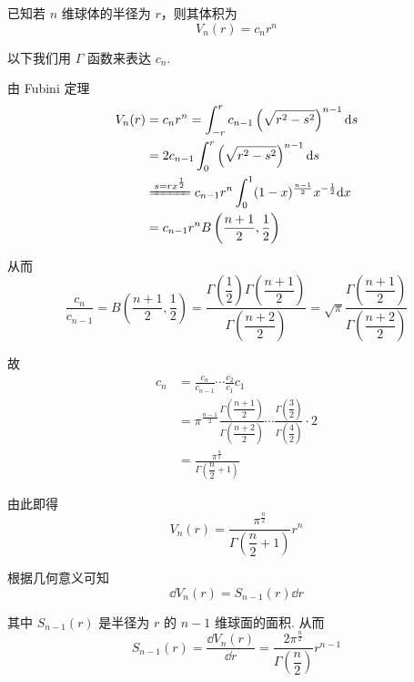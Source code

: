 \begin{example}
    已知若 $n$ 维球体的半径为 $r$，则其体积为
$$
V_n(r)=c_nr^n
$$

    以下我们用 $\Gamma$ 函数来表达 $c_n$.

    由 Fubini 定理
$$
\begin{aligned}
    V_n(r)&=c_nr^n=\int_{-r}^rc_{n-1}\left(\sqrt{r^2-s^2}\right)^{n-1}\dd s\\
    &=2c_{n-1}\int_0^r\left(\sqrt{r^2-s^2}\right)^{n-1}\dd s\\
    &\xlongequal{s=rx^\frac{1}{2}}c_{n-1}r^n\int_0^1(1-x)^\frac{n-1}{2}x^{-\frac{1}{2}}\dd x\\
    &=c_{n-1}r^nB\left(\frac{n+1}{2},\frac{1}{2}\right)
\end{aligned}
$$

    从而
$$
\frac{c_n}{c_{n-1}}=B\left(\frac{n+1}{2},\frac{1}{2}\right)=\frac{\Gamma\left(\dfrac{1}{2}\right)\Gamma\left(\dfrac{n+1}{2}\right)}{\Gamma\left(\dfrac{n+2}{2}\right)}=\sqrt{\pi}\frac{\Gamma\left(\dfrac{n+1}{2}\right)}{\Gamma\left(\dfrac{n+2}{2}\right)}
$$

    故
$$
\begin{aligned}
    c_n&=\frac{c_n}{c_{n-1}}\cdots\frac{c_2}{c_1}c_1\\
    &=\pi^\frac{n-1}{2}\frac{\Gamma\left(\dfrac{n+1}{2}\right)}{\Gamma\left(\dfrac{n+2}{2}\right)}\cdots\frac{\Gamma\left(\dfrac{3}{2}\right)}{\Gamma\left(\dfrac{4}{2}\right)}\cdot 2\\
    &=\frac{\pi^\frac{n}{2}}{\Gamma\left(\dfrac{n}{2}+1\right)}
\end{aligned}
$$

    由此即得
$$
V_n(r)=\frac{\pi^\frac{n}{2}}{\Gamma\left(\dfrac{n}{2}+1\right)}r^n
$$

    根据几何意义可知
$$
\dd V_n(r)=S_{n-1}(r)\dd r
$$

    其中 $S_{n-1}(r)$ 是半径为 $r$ 的 $n-1$ 维球面的面积. 从而
$$
S_{n-1}(r)=\frac{\dd V_n(r)}{\dd r}=\frac{2\pi^\frac{n}{2}}{\Gamma\left(\dfrac{n}{2}\right)}r^{n-1}
$$
\end{example}
